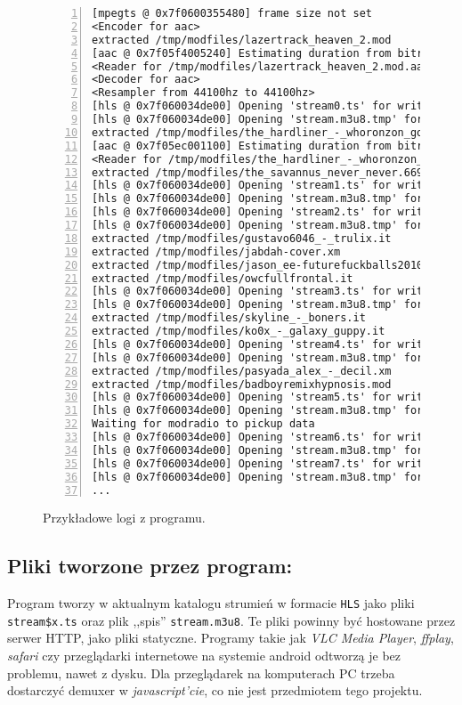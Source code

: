 \documentclass[a4paper,12pt]{article}
\begin{document}
\begin{figure}[h]
\begin{lstlisting}[frame=LB,basicstyle=\ttfamily\scriptsize, numbers=left]
[mpegts @ 0x7f0600355480] frame size not set
<Encoder for aac>
extracted /tmp/modfiles/lazertrack_heaven_2.mod
[aac @ 0x7f05f4005240] Estimating duration from bitrate, this may be inaccurate
<Reader for /tmp/modfiles/lazertrack_heaven_2.mod.aac>
<Decoder for aac>
<Resampler from 44100hz to 44100hz>
[hls @ 0x7f060034de00] Opening 'stream0.ts' for writing
[hls @ 0x7f060034de00] Opening 'stream.m3u8.tmp' for writing
extracted /tmp/modfiles/the_hardliner_-_whoronzon_gohonzon.xm
[aac @ 0x7f05ec001100] Estimating duration from bitrate, this may be inaccurate
<Reader for /tmp/modfiles/the_hardliner_-_whoronzon_gohonzon.xm.aac>
extracted /tmp/modfiles/the_savannus_never_never.669
[hls @ 0x7f060034de00] Opening 'stream1.ts' for writing
[hls @ 0x7f060034de00] Opening 'stream.m3u8.tmp' for writing
[hls @ 0x7f060034de00] Opening 'stream2.ts' for writing
[hls @ 0x7f060034de00] Opening 'stream.m3u8.tmp' for writing
extracted /tmp/modfiles/gustavo6046_-_trulix.it
extracted /tmp/modfiles/jabdah-cover.xm
extracted /tmp/modfiles/jason_ee-futurefuckballs2010_cover.it
extracted /tmp/modfiles/owcfullfrontal.it
[hls @ 0x7f060034de00] Opening 'stream3.ts' for writing
[hls @ 0x7f060034de00] Opening 'stream.m3u8.tmp' for writing
extracted /tmp/modfiles/skyline_-_boners.it
extracted /tmp/modfiles/ko0x_-_galaxy_guppy.it
[hls @ 0x7f060034de00] Opening 'stream4.ts' for writing
[hls @ 0x7f060034de00] Opening 'stream.m3u8.tmp' for writing
extracted /tmp/modfiles/pasyada_alex_-_decil.xm
extracted /tmp/modfiles/badboyremixhypnosis.mod
[hls @ 0x7f060034de00] Opening 'stream5.ts' for writing
[hls @ 0x7f060034de00] Opening 'stream.m3u8.tmp' for writing
Waiting for modradio to pickup data
[hls @ 0x7f060034de00] Opening 'stream6.ts' for writing
[hls @ 0x7f060034de00] Opening 'stream.m3u8.tmp' for writing
[hls @ 0x7f060034de00] Opening 'stream7.ts' for writing
[hls @ 0x7f060034de00] Opening 'stream.m3u8.tmp' for writing
...
\end{lstlisting}
\centering
    \caption{Przykładowe logi z programu.}
    \label{lst:logs}
\end{figure}

\subsection*{Pliki tworzone przez program:}

Program tworzy w aktualnym katalogu strumień w formacie \texttt{HLS} jako pliki
\texttt{stream\$x.ts} oraz plik ,,spis'' \texttt{stream.m3u8}. Te pliki powinny
być hostowane przez serwer HTTP, jako pliki statyczne. Programy takie jak
\emph{VLC Media Player}, \emph{ffplay}, \emph{safari} czy przeglądarki
internetowe na systemie android odtworzą je bez problemu, nawet z dysku. Dla
przeglądarek na komputerach PC trzeba dostarczyć demuxer w
\emph{javascript'cie}, co nie jest przedmiotem tego projektu.
\end{document}
